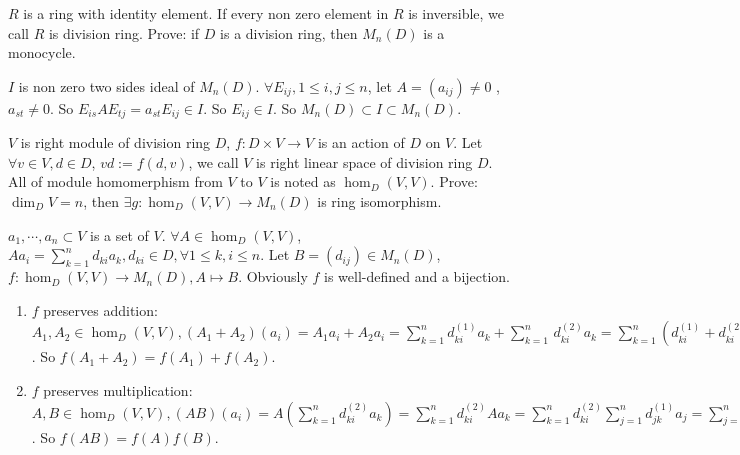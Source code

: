 \documentclass{ctexart}
\newif\ifpreface
\begin{document}
\large
\setlength{\baselineskip}{1.2em}
\ifpreface
    
\else
\maketitle
\fi
{}
\begin{problem}
  \(R\) is a ring with identity element. If every non zero element in \(R\) is inversible, we call \(R\) is division ring.
  Prove: if \( D\) is a division ring, then \(M_n(D)\) is a monocycle.
\end{problem}
\begin{solution}
 \(I\) is non zero two sides ideal of \(M_n(D)\). \(\forall E_{ij}, 1 \leq i, j \leq n\), let \(A=(a_{ij}) \neq 0\) ,
 \(a_{st} \neq 0\). So \(E_{is}AE_{tj}=a_{st}E_{ij} \in I\). So \(E_{ij} \in I\).
 So \(M_n(D) \subset I \subset M_n(D)\).
\end{solution}

\begin{problem}
   \(V\) is right module of division ring \(D\), \(f: D \times V \to V\) is an action of \(D\) on \(V\).
   Let \(\forall v \in V, d \in D\), \(vd:=f(d,v)\), we call \(V\) is right linear space 
   of division ring \(D\). All of module homomerphism from \(V\) to \(V\) is noted as \(\hom_D(V,V)\).
   Prove: \(\dim_DV = n\), then \(\exists g: \hom_D(V,V) \to M_n(D)\) is ring isomorphism.

\end{problem}
\begin{solution}
  \({a_1,\cdots,a_n} \subset V\) is a set of \(V\). \(\forall A \in \hom_D(V,V)\), \(A a_i= \sum_{k=1}^{n} d_{ki}a_k, d_{ki} \in D, \forall 1 \leq k, i \leq n\).
  Let \(B= (d_{ij}) \in M_n(D)\), \(f: \hom_D(V,V) \to M_n(D), A \mapsto B\). Obviously \(f\) is 
  well-defined and a bijection.
  \begin{enumerate}
    \item \(f\) preserves addition: \(A_1,A_2 \in \hom_D(V,V), (A_1+A_2)(a_i)=A_1 a_i+A_2 a_i=\sum_{k=1}^{n} d_{ki}^{(1)}a_k+\sum_{k=1}^{n}\, d_{ki}^{(2)} a_k=\sum_{k=1}^{n} (d_{ki}^{(1)}+d_{ki}^{(2)}) a_k\).
      So \(f(A_1+A_2)=f(A_1)+f(A_2)\).
    \item \(f\) preserves multiplication: \(A, B \in \hom_D(V,V), (AB)(a_i)=A(\sum_{k=1}^{n} d_{ki}^{(2)}a_k )=\sum_{k=1}^{n} d_{ki}^{(2)}A a_k=
      \sum_{k=1}^{n} d_{ki}^{(2)}\sum_{j=1}^{n} d_{jk}^{(1)}a_j=\sum_{j=1}^{n} \sum_{k=1}^{n} d_{jk}^{(1)}d_{ki}^{(2)}a_j\).
      So \(f(AB)=f(A)f(B)\).

  \end{enumerate}
\end{solution}
\end{document}
